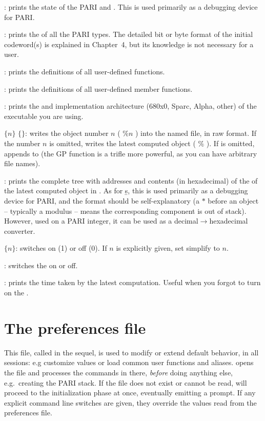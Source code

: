 : prints the state of the PARI  and .
This is used primarily as a debugging device for PARI.

: prints the  of all the PARI
types. The detailed bit or byte format of the initial codeword(s) is
explained in Chapter~4, but its knowledge is not necessary for a  user.

: prints the definitions of all user-defined functions.

: prints the definitions of all user-defined member functions.

: prints the  and implementation architecture
(680x0, Sparc, Alpha, other) of the  executable you are using.

 $\{n\}$ $\{$$\}$: writes the object number
$n$ ( $\%n$ ) into the named file, in raw format. If the number $n$ is
omitted, writes the latest computed object ( $\%$ ). If  is
omitted, appends to  (the GP function  is a trifle more
powerful, as you can have arbitrary file names).

: prints the complete tree with addresses and contents (in
hexadecimal) of the  of the latest computed
object in . As for \b{s}, this is used primarily as a debugging device for
PARI, and the format should be self-explanatory (a $*$ before an object --
typically a modulus -- means the corresponding component is out of stack).
However, used on a PARI integer, it can be used as a
decimal$\rightarrow$hexadecimal converter.

 $\{n\}$: switches  on (1) or off (0). If $n$
is explicitly given, set simplify to $n$.

\subseckbd{\#}: switches the  on or off.

\subseckbd{\#\#}: prints the time taken by the latest computation.
Useful when you forgot to turn on the .


\section{The preferences file}
\label{se:gprc}

This file, called  in the sequel, is used to modify or extend
default behavior, in all  sessions: e.g customize  values or
load common user functions and aliases.  opens the  file and
processes the commands in there, \emph{before} doing anything else,
e.g.~creating the PARI stack. If the file does not exist or cannot be read,
 will proceed to the initialization phase at once, eventually emitting a
prompt. If any explicit command line switches are given, they override the
values read from the preferences file.

